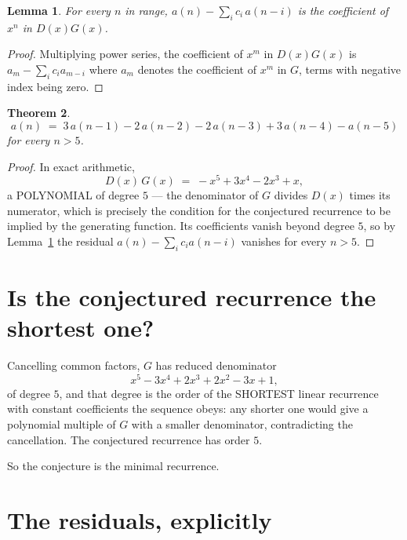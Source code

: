\documentclass[11pt,a4paper]{article}
\theoremstyle{plain}
\newtheorem{theorem}{Theorem}
\newtheorem{lemma}[theorem]{Lemma}
\theoremstyle{definition}
\begin{document}
\begin{lemma}\label{lem:key}
For every $n$ in range, $a(n)-\sum_i c_i\,a(n-i)$ is the coefficient of $x^{n}$ in
$D(x)G(x)$.
\end{lemma}

\begin{proof}
Multiplying power series, the coefficient of $x^{m}$ in $D(x)G(x)$ is
$a_m-\sum_i c_i a_{m-i}$ where $a_m$ denotes the coefficient of $x^{m}$ in $G$, terms with
negative index being zero.
\end{proof}

\begin{theorem}
\[
a(n)\;=\;3\,a(n-1) - 2\,a(n-2) - 2\,a(n-3) + 3\,a(n-4) - a(n-5)
\]
for every $n>5$.
\end{theorem}

\begin{proof}
In exact arithmetic,
\[
D(x)\,G(x)\;=\;- x^{5} + 3 x^{4} - 2 x^{3} + x,
\]
a POLYNOMIAL of degree $5$ --- the denominator of $G$ divides $D(x)$ times its numerator,
which is precisely the condition for the conjectured recurrence to be implied by the
generating function. Its coefficients vanish beyond degree $5$, so by
Lemma~\ref{lem:key} the residual $a(n)-\sum_ic_ia(n-i)$ vanishes for every
$n>5$.
\end{proof}

\section{Is the conjectured recurrence the shortest one?}

Cancelling common factors, $G$ has reduced denominator
\[
x^{5} - 3 x^{4} + 2 x^{3} + 2 x^{2} - 3 x + 1,
\]
of degree $5$, and that degree is the order of the SHORTEST linear recurrence with
constant coefficients the sequence obeys: any shorter one would give a polynomial multiple of
$G$ with a smaller denominator, contradicting the cancellation. The conjectured recurrence has
order $5$.

So the conjecture is the minimal recurrence.

\section{The residuals, explicitly}
\end{document}
